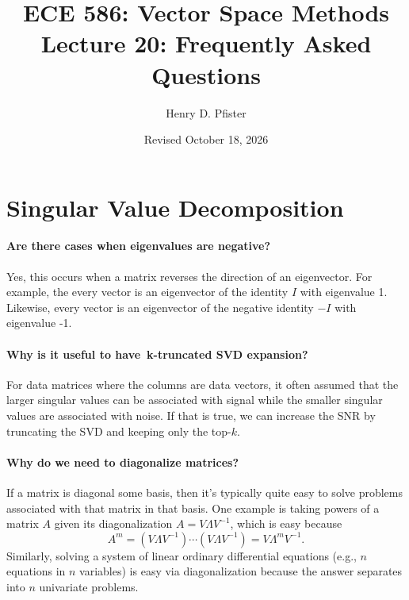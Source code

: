 \documentclass[10pt,english]{article}
\begin{document}
\title{ECE 586: Vector Space Methods \\ Lecture 20: Frequently Asked Questions}
\author{Henry D. Pfister \\ \univ}
\date{Revised October 18, 2026}

\maketitle

\section{Singular Value Decomposition}


\paragraph{Are there cases when eigenvalues are negative?}

Yes, this occurs when a matrix reverses the direction of an eigenvector.  For example, the every vector is an eigenvector of the identity $I$ with eigenvalue 1.  Likewise, every vector is an eigenvector of the negative identity $-I$ with eigenvalue -1.

\paragraph{Why is it useful to have k-truncated SVD expansion?}

For data matrices where the columns are data vectors, it often assumed that the larger singular values can be associated with signal while the smaller singular values are associated with noise.
If that is true, we can increase the SNR by truncating the SVD and keeping only the top-$k$.


\paragraph{Why do we need to diagonalize matrices?}
 If a matrix is diagonal some basis, then it's typically quite easy to solve problems associated with that matrix in that basis.  One example is taking powers of a matrix $A$ given its diagonalization $A= V \Lambda V^{-1}$, which is easy because
 \[ A^m = (V \Lambda V^{-1}) \cdots (V \Lambda V^{-1}) = V \Lambda^m V^{-1}.  \]
 Similarly, solving a system of linear ordinary differential equations (e.g., $n$ equations in $n$ variables) is easy via diagonalization because the answer separates into $n$ univariate problems.
\end{document}
